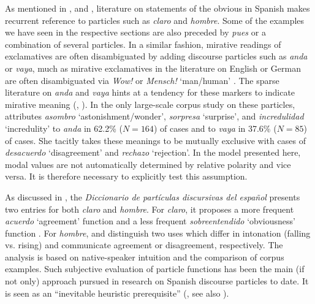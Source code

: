 As mentioned in ,  and , literature on statements of the obvious in Spanish makes recurrent reference to particles such as \textit{claro} and \textit{hombre}. Some of the examples we have seen in the respective sections are also preceded by \textit{pues} or a combination of several particles. In a similar fashion, mirative readings of exclamatives are often disambiguated by adding discourse particles such as \textit{anda} or \textit{vaya}, much as mirative exclamatives in the literature on English or German are often disambiguated via \textit{Wow!} or \textit{Mensch!} `man/human' \citep{Grosz.2012}. The sparse literature on \textit{anda} and \textit{vaya} hints at a tendency for these markers to indicate mirative meaning (\cite[52]{OctaviodeToledoyHuerta.20012002}, \cite[161]{BorregueroZuloaga.2015}). In the only large-scale corpus study on these particles, \citet[125]{Tanghe.2016} attributes \textit{asombro} `astonishment/wonder', \textit{sorpresa} `surprise', and \textit{incredulidad} `incredulity' to \textit{anda} in 62.2\% ($N=164$) of cases and to \textit{vaya} in 37.6\% ($N=85$) of cases. She tacitly takes these meanings to be mutually exclusive with cases of \textit{desacuerdo} `disagreement' and \textit{rechazo} `rejection'. In the model presented here, modal values are not automatically determined by relative polarity and vice versa. It is therefore necessary to explicitly test this assumption.

As discussed in , the \textit{Diccionario de partículas discursivas del español} pres\-ents two entries for both \textit{claro} and \textit{hombre}. For \textit{claro}, it proposes a more frequent \textit{acuerdo} `agreement' function and a less frequent \textit{sobreentendido} `obviousness' function \citep{PonsBorderia.2011}. For \textit{hombre}, \citet{BrizVillalba.2011} and \citet[32--40]{Briz.2012} distinguish two uses which differ in intonation (falling vs. rising) and communicate agreement or disagreement, respectively. The analysis is based on native-speaker intuition and the comparison of corpus examples. Such subjective evaluation of particle functions has been the main (if not only) approach pursued in research on Spanish discourse particles to date. It is seen as an ``inevitable heuristic prerequisite'' (\cite[114]{Tanghe.2016}, see also \cite[14]{GhezziMolinelli.2014intro}).

